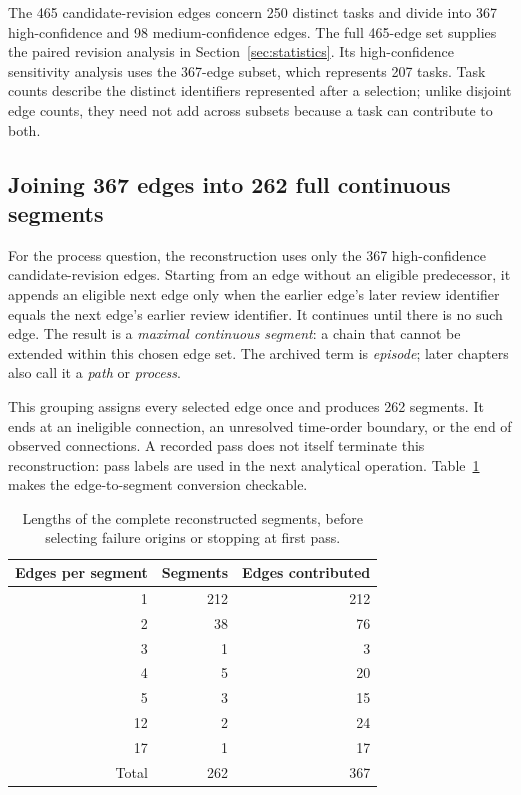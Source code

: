 The 465 candidate-revision edges concern 250 distinct tasks and divide into 367 high-confidence and 98 medium-confidence edges. The full 465-edge set supplies the paired revision analysis in Section~\ref{sec:statistics}. Its high-confidence sensitivity analysis uses the 367-edge subset, which represents 207 tasks. Task counts describe the distinct identifiers represented after a selection; unlike disjoint edge counts, they need not add across subsets because a task can contribute to both.

\subsection{Joining 367 edges into 262 full continuous segments}
\label{subsec:segment-rule}
For the process question, the reconstruction uses only the 367 high-confidence candidate-revision edges. Starting from an edge without an eligible predecessor, it appends an eligible next edge only when the earlier edge's later review identifier equals the next edge's earlier review identifier. It continues until there is no such edge. The result is a \emph{maximal continuous segment}: a chain that cannot be extended within this chosen edge set. The archived term is \emph{episode}; later chapters also call it a \emph{path} or \emph{process}.

This grouping assigns every selected edge once and produces 262 segments. It ends at an ineligible connection, an unresolved time-order boundary, or the end of observed connections. A recorded pass does not itself terminate this reconstruction: pass labels are used in the next analytical operation. Table~\ref{tab:segment-lengths} makes the edge-to-segment conversion checkable.

\begin{table}[htbp]
\centering\small
\caption{Lengths of the complete reconstructed segments, before selecting failure origins or stopping at first pass.}
\label{tab:segment-lengths}
\begin{tabular}{rrr}
\toprule
Edges per segment & Segments & Edges contributed \\
\midrule
1 & 212 & 212 \\
2 & 38 & 76 \\
3 & 1 & 3 \\
4 & 5 & 20 \\
5 & 3 & 15 \\
12 & 2 & 24 \\
17 & 1 & 17 \\
\midrule
Total & 262 & 367 \\
\bottomrule
\end{tabular}
\end{table}

